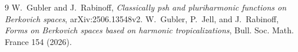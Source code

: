 \documentclass[11pt]{article}
\begin{document}


\begin{thebibliography}{9}
W.~Gubler and J.~Rabinoff,
\emph{Classically psh and pluriharmonic functions on Berkovich spaces},
arXiv:2506.13548v2.
W.~Gubler, P.~Jell, and J.~Rabinoff,
\emph{Forms on Berkovich spaces based on harmonic tropicalizations},
Bull. Soc. Math. France 154 (2026).
\end{thebibliography}
\end{document}
